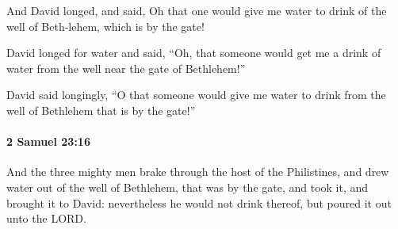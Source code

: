 			\begin{versebox}
					\item[BHS] 
					\item[ASV] And David longed, and said, Oh that one would give me water to drink of the well of Beth-lehem, which is by the gate!
					\item[NIV] David longed for water and said, “Oh, that someone would get me a drink of water from the well near the gate of Bethlehem!”
					\item[NRSV] David said longingly, “O that someone would give me water to drink from the well of Bethlehem that is by the gate!”
			\end{versebox}

		\paragraph{2 Samuel 23:16} %
			\label{2SAMUEL-23-16}

			And the three mighty men brake through the host of the Philistines, and drew water out of the well of Bethlehem, that was by the gate, and took it, and brought it to David: nevertheless he would not drink thereof, but poured it out unto the LORD.


